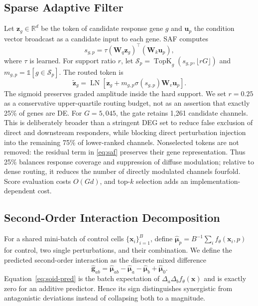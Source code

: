 \documentclass[conference]{IEEEtran}
\newcommand{\saf}{SAF}
\newcommand{\R}{\mathbb{R}}
\begin{document}
\subsection{Sparse Adaptive Filter}
Let $\mathbf{z}_g\in\R^d$ be the token of candidate response gene $g$ and
$\mathbf{u}_p$ the condition vector broadcast as a candidate input to each
gene. \saf{} computes
\begin{equation}
 s_{g,p}=\tau(\mathbf{W}_q\mathbf{z}_g)^\top
                 (\mathbf{W}_k\mathbf{u}_{p}),
 \label{eq:score}
\end{equation}
where $\tau$ is learned. For support ratio $r$, let
$\mathcal{S}_p=\operatorname{TopK}_g(s_{g,p},\lfloor rG\rfloor)$ and
$m_{g,p}=\mathbb{1}[g\in\mathcal{S}_p]$. The routed token is
\begin{equation}
 \tilde{\mathbf{z}}_g=\operatorname{LN}\!\left[
 \mathbf{z}_g+m_{g,p}\sigma(s_{g,p})\mathbf{W}_v\mathbf{u}_{p}\right].
 \label{eq:saf}
\end{equation}
The sigmoid preserves graded amplitude inside the hard support. We set
$r=0.25$ as a conservative upper-quartile routing budget, not as an assertion
that exactly 25\% of genes are DE. For $G=5{,}045$, the gate retains 1,261
candidate channels. This is deliberately broader than a stringent DEG set to
reduce false exclusion of direct and downstream responders, while blocking
direct perturbation injection into the remaining 75\% of lower-ranked
channels. Nonselected tokens are not removed: the residual term in
\eqref{eq:saf} preserves their gene representation. Thus 25\% balances response
coverage and suppression of diffuse modulation; relative to dense routing, it
reduces the number of directly modulated channels fourfold. Score evaluation
costs $O(Gd)$, and top-$k$ selection adds an implementation-dependent cost.

\subsection{Second-Order Interaction Decomposition}
For a shared mini-batch of control cells $\{\mathbf{x}_i\}_{i=1}^{B}$, define
$\hat{\boldsymbol\mu}_p=B^{-1}\sum_i f_\theta(\mathbf{x}_i,p)$ for control,
two single perturbations, and their combination. We define the predicted
second-order interaction as the discrete mixed difference
\begin{equation}
 \hat{\mathbf g}_{ab}=\hat{\boldsymbol\mu}_{ab}
 -\hat{\boldsymbol\mu}_a-\hat{\boldsymbol\mu}_b+\hat{\boldsymbol\mu}_0.
 \label{eq:soid-pred}
\end{equation}
Equation~\eqref{eq:soid-pred} is the batch expectation of
$\Delta_a\Delta_b f_\theta(\mathbf{x})$ and is exactly zero for an additive
predictor. Hence its sign distinguishes synergistic from antagonistic
deviations instead of collapsing both to a magnitude.
\end{document}
